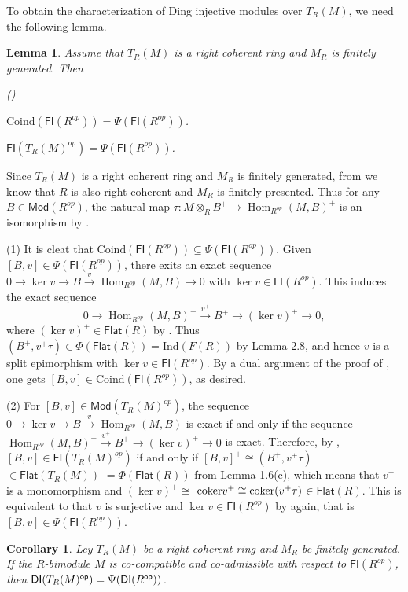 \documentclass[10pt,twoside]{amsart}
\theoremstyle{bfupright head,slanted body}
\theoremstyle{bfupright head,upright body}
\theoremstyle{fixed bf head,slanted body}
\newtheorem{cor}[res]{Corollary}        \newtheorem*{cor*}{Corollary}
\newtheorem{lem}[res]{Lemma}            \newtheorem*{lem*}{Lemma}
\theoremstyle{fixed bf head,upright body}
\theoremstyle{numbered paragraph}
\newlength{\thmlistleft}        %
\newlength{\thmlistright}       %
\newlength{\thmlistpartopsep}   %
\newlength{\thmlisttopsep}      %
\newlength{\thmlistparsep}      %
\newlength{\thmlistitemsep}     %
\newcounter{prt}
\newenvironment{prt}{\begin{list}{\upshape (\alph{prt})}%
    {\usecounter{prt}%
      \setlength{\leftmargin}{\thmlistleft}%
      \setlength{\labelwidth}{\thmlistleft}%
      \setlength{\rightmargin}{\thmlistright}%
      \setlength{\partopsep}{\thmlistpartopsep}%
      \setlength{\topsep}{\thmlisttopsep}%
      \setlength{\parsep}{\thmlistparsep}%
      \setlength{\itemsep}{\thmlistitemsep}}}%
  {\end{list}}%
\newenvironment{prf*}[1][Proof]{%
  \begin{proof}[\bf #1]
    \setcounter{equation}{0}
    \renewcommand{\theequation}{\arabic{equation}}}
  {\end{proof}
}
\numberwithin{equation}{res}
\newcommand{\DI}{\mathsf{DI}}
\newcommand{\Flat}{\mathsf{Flat}}
\newcommand{\FI}{\mathsf{FI}}
\newcommand{\Mod}{\mathsf{Mod}}
\newcommand{\Coind}{\mathrm{Coind}}
\newcommand{\Ind}{\mathrm{Ind}}
\newcommand{\Rop}{R^{\sf op}}
\newcommand{\op}{\sf op}
\newcommand{\cok}{\mbox{\rm coker}}
\newcommand{\Hom}{\operatorname{Hom}}
\begin{document}
To obtain the characterization of Ding injective modules over $T_R(M)$,
we need the following lemma.


\begin{lem} \label{homological modules}
Assume that $T_R(M)$ is a right coherent ring and $M_{R}$ is finitely generated. Then
\begin{prt}
\item[(1)] 
$\Coind(\FI(R^{op}))=\Psi(\FI(R^{op}))$.
\item[(2)] 
$\FI(T_R(M)^{op}) = \Psi(\FI(R^{op}))$.
\end{prt}
\end{lem}

\begin{prf*}
 Since $T_R(M)$ is a right coherent ring and $M_{R}$ is finitely generated, 
from \cite[Theorem 3.5]{DL} we know that $R$ is also right coherent and $M_{R}$ is finitely presented. Thus for any $B\in \Mod(R^{op})$, the natural map $\tau: M\otimes_{R} B^{+}\to \Hom_{R^{op}}(M, B)^{+}$ is an isomorphism by \cite[Lemma 3.55(ii)]{Rot}.

(1) It is cleat that $\Coind(\FI(R^{op}))\subseteq\Psi(\FI(R^{op}))$.
Given $[B, v]\in \Psi(\FI(R^{op}))$, there exits an exact sequence $0\to \ker v\to B\overset{v}\to\Hom_{R^{op}}(M, B)\to 0$
with $\ker v\in\FI(R^{op})$. This induces the exact sequence $$0\to\Hom_{R^{op}}(M, B)^{+}\overset{v^{+}}\to B^{+}\to (\ker v)^{+}\to 0,$$ where $(\ker v)^{+}\in\Flat(R)$ by \cite[Theorem 2.2]{Fi}.
Thus $(B^{+}, v^{+}\tau)\in\Phi(\Flat(R))=\Ind(F(R))$ by Lemma 2.8,
and hence $v$ is a split epimorphism with $\ker v\in \FI(R^{op})$.
By a dual argument of the proof of \cite[Lemma 2.3]{CL},
one gets $[B, v]\in\Coind(\FI(R^{op}))$, as desired.

(2) For $[B, v]\in\Mod(T_R(M)^{op})$, the sequence $0\to \ker v\to B\overset{v}\to\Hom_{R^{op}}(M, B)$ is exact 
if and only if the sequence $\Hom_{R^{op}}(M, B)^{+}\overset{v^{+}}\to B^{+}\to (\ker v)^{+}\to 0$ is exact.
Therefore, by \cite[Theorem 2.2]{Fi}, $[B, v]\in\FI(T_R(M)^{op})$ if and only if $[B, v]^{+}\cong(B^{+}, v^{+}\tau)$ $\in\Flat(T_R(M))$
$=\Phi(\Flat(R))$ from Lemma 1.6(c),
which means that $v^{+}$ is a monomorphism and $(\ker v)^{+}\cong$ $\cok v^{+}\cong\cok (v^{+}\tau)$$\in\Flat(R)$.
This is equivalent to that  $v$ is surjective and $\ker v\in\FI(R^{op})$  by \cite[Theorem 2.2]{Fi} again,
that is $[B, v]\in\Psi(\FI(R^{op}))$.
\end{prf*}

\begin{cor} \label{THM GITRM = Psi cons}
Ley $T_R(M)$ be a right coherent ring and $M_{R}$ be finitely generated.
If the $R$-bimodule $M$ is co-compatible and co-admissible with respect to $\FI(R^{op})$, 
then $\DI(T_R(M)^{\op}) = \Psi(\DI(\Rop))$.
\end{cor}
\end{document}

